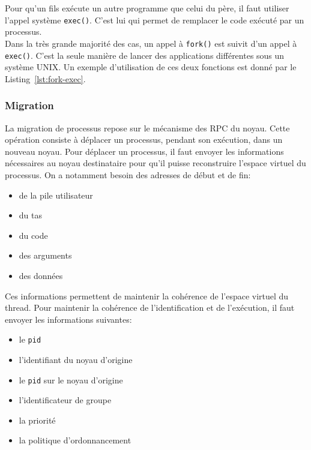        Pour qu'un fils exécute un autre programme que celui du père, il faut
        utiliser l'appel système \texttt{exec()}. C'est lui qui permet de
        remplacer le code exécuté par un processus.\\

        Dans la très grande majorité des cas, un appel à \texttt{fork()} est
        suivit d'un appel à \texttt{exec()}. C'est la seule manière de lancer
        des applications différentes sous un système UNIX. Un exemple
        d'utilisation de ces deux fonctions est donné par le
        Listing~\ref{lst:fork-exec}.
        \clearpage

         \FloatBarrier

      \subsubsection{Migration}

        La migration de processus repose sur le mécanisme des RPC du
        noyau. Cette opération consiste à déplacer un processus, pendant son
        exécution, dans un nouveau noyau. Pour déplacer un processus, il faut
        envoyer les informations nécessaires au noyau destinataire pour qu'il
        puisse reconstruire l'espace virtuel du processus. On a notamment besoin
        des adresses de début et de fin:
        \begin{itemize}
          \item de la pile utilisateur
          \item du tas
          \item du code
          \item des arguments
          \item des données
        \end{itemize}
        Ces informations permettent de maintenir la cohérence de l'espace
        virtuel du thread. Pour maintenir la cohérence de l'identification et de
        l'exécution, il faut envoyer les informations suivantes:
        \begin{itemize}
          \item le \texttt{pid}
          \item l'identifiant du noyau d'origine
          \item le \texttt{pid} sur le noyau d'origine
          \item l'identificateur de groupe
          \item la priorité
          \item la politique d'ordonnancement\\
        \end{itemize}

